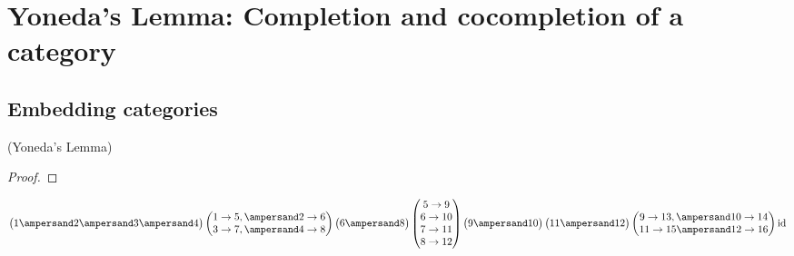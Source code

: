 
\section{Yoneda's Lemma: Completion and cocompletion of a category}

\subsection{Embedding categories}

\begin{lemma}{(Yoneda's Lemma)}

\begin{proof}

\end{proof}
\end{lemma}
\[
\begin{pmatrix}1 \ampersand 2 \ampersand 3 \ampersand 4\end{pmatrix}
\begin{pmatrix} 1\to5, \ampersand 2\to6 \\ 3\to7, \ampersand 4\to8 \end{pmatrix}
\begin{pmatrix}6 \ampersand 8\end{pmatrix}
\begin{pmatrix}5\to9\\6\to10\\7\to11\\8\to12\end{pmatrix}
\begin{pmatrix}9\ampersand10\end{pmatrix}\begin{pmatrix}11\ampersand12\end{pmatrix}
\begin{pmatrix}9\to13, \ampersand 10\to14\\11\to15 \ampersand 12\to16\end{pmatrix}
\textup{id}
\]


